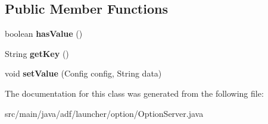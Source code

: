 \subsection*{Public Member Functions}
\begin{DoxyCompactItemize}
\item 
\hypertarget{classadf_1_1launcher_1_1option_1_1OptionServer_aba5dd0c624edc9c0e2fe244c2de8bb45}{}\label{classadf_1_1launcher_1_1option_1_1OptionServer_aba5dd0c624edc9c0e2fe244c2de8bb45} 
boolean {\bfseries has\+Value} ()
\item 
\hypertarget{classadf_1_1launcher_1_1option_1_1OptionServer_aec747674c4e4ff8d11405d3478bd89e9}{}\label{classadf_1_1launcher_1_1option_1_1OptionServer_aec747674c4e4ff8d11405d3478bd89e9} 
String {\bfseries get\+Key} ()
\item 
\hypertarget{classadf_1_1launcher_1_1option_1_1OptionServer_a0450c78767f67a76d85606541869f66d}{}\label{classadf_1_1launcher_1_1option_1_1OptionServer_a0450c78767f67a76d85606541869f66d} 
void {\bfseries set\+Value} (Config config, String data)
\end{DoxyCompactItemize}


The documentation for this class was generated from the following file\+:\begin{DoxyCompactItemize}
\item 
src/main/java/adf/launcher/option/Option\+Server.\+java\end{DoxyCompactItemize}
